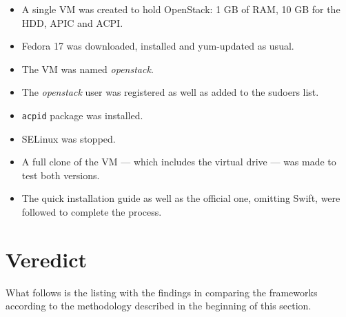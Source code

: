 \begin{itemize}
 \item A single VM was created to hold OpenStack: 1 GB of RAM, 10 GB for the HDD, APIC and ACPI.
 \item Fedora 17 was downloaded, installed and yum-updated as usual.
 \item The VM was named \emph{openstack}.
 \item The \emph{openstack} user was registered as well as added to the sudoers list.
 \item \texttt{acpid} package was installed.
 \item SELinux was stopped.
 \item A full clone of the VM --- which includes the virtual drive --- was made to test both versions.
 \item The quick installation guide as well as the official one, omitting Swift, were followed to complete the process.
\end{itemize}

\section{Veredict}\label{sec:conclusiones}

\noindent What follows is the listing with the findings in comparing the frameworks according to the methodology described in the beginning of this section.
 
